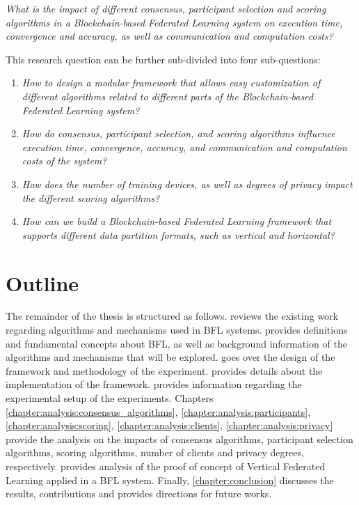 \begin{center}
    \textit{What is the impact of different consensus, participant selection and scoring algorithms in a Blockchain-based Federated Learning system on execution time, convergence and accuracy, as well as communication and computation costs?}
\end{center}

This research question can be further sub-divided into four sub-questions:

\begin{enumerate}
    \item \textit{How to design a modular framework that allows easy customization of different algorithms related to different parts of the Blockchain-based Federated Learning system?}
    
    \item \textit{How do consensus, participant selection, and scoring algorithms influence execution time, convergence, accuracy, and communication and computation costs of the system?}
    
    \item \textit{How does the number of training devices, as well as degrees of privacy impact the different scoring algorithms?}
    
    \item \textit{How can we build a Blockchain-based Federated Learning framework that supports different data partition formats, such as vertical and horizontal?}
\end{enumerate}

\section{Outline}\label{intro:outline}

The remainder of the thesis is structured as follows.  reviews the existing work regarding algorithms and mechanisms used in BFL systems.  provides definitions and fundamental concepts about BFL, as well as background information of the algorithms and mechanisms that will be explored.  goes over the design of the framework and methodology of the experiment.  provides details about the implementation of the framework.  provides information regarding the experimental setup of the experiments. Chapters \ref{chapter:analysis:consensus_algorithms}, \ref{chapter:analysis:participants}, \ref{chapter:analysis:scoring}, \ref{chapter:analysis:clients}, \ref{chapter:analysis:privacy} provide the analysis on the impacts of consensus algorithms, participant selection algorithms, scoring algorithms, number of clients and privacy degrees, respectively.  provides analysis of the proof of concept of Vertical Federated Learning applied in a BFL system. Finally, \cref{chapter:conclusion} discusses the results, contributions and provides directions for future works.

